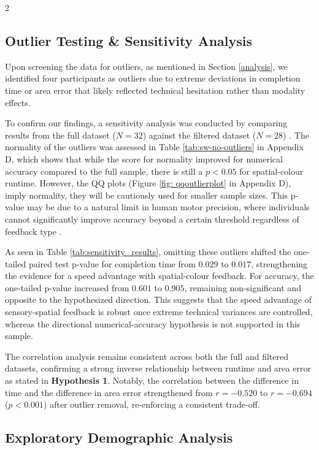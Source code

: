 \documentclass[a4paper,12pt]{article}
\begin{document}
\begin{multicols}{2}


\subsection{Outlier Testing \& Sensitivity Analysis}
Upon screening the data for outliers, as mentioned in Section \ref{analysis}, we identified four participants as outliers due to extreme deviations in completion time or area error that likely reflected technical hesitation rather than modality effects. 

To confirm our findings, a sensitivity analysis was conducted by comparing results from the full dataset ($N=32$) against the filtered dataset ($N=28$) \cite{dave2024outliers}. The normality of the outliers was assessed in Table \ref{tab:sw-no-outliers} in Appendix D, which shows that while the score for normality improved for numerical accuracy compared to the full sample, there is still a $p<0.05$ for spatial-colour runtime. However, the QQ plots (Figure \ref{fig: qqoutlierplot} in Appendix D), imply normality, they will be cautiously used for smaller sample sizes. This p-value may be due to a natural limit in human motor precision, where individuals cannot significantly improve accuracy beyond a certain threshold regardless of feedback type \cite{berard2011limits}. 

As seen in Table \ref{tab:sensitivity_results}, omitting these outliers shifted the one-tailed paired test p-value for completion time from $0.029$ to $0.017$, strengthening the evidence for a speed advantage with spatial-colour feedback. For accuracy, the one-tailed p-value increased from $0.601$ to $0.905$, remaining non-significant and opposite to the hypothesized direction. This suggests that the speed advantage of sensory-spatial feedback is robust once extreme technical variances are controlled, whereas the directional numerical-accuracy hypothesis is not supported in this sample.

The correlation analysis remains consistent across both the full and filtered datasets, confirming a strong inverse relationship between runtime and area error as stated in \textbf{Hypothesis 1}. Notably, the correlation between the difference in time and the difference in area error strengthened from $r = -0.520$ to $r = -0.694$ ($p < 0.001$) after outlier removal, re-enforcing a consistent trade-off.

\subsection{Exploratory Demographic Analysis}

\end{multicols}
\end{document}
